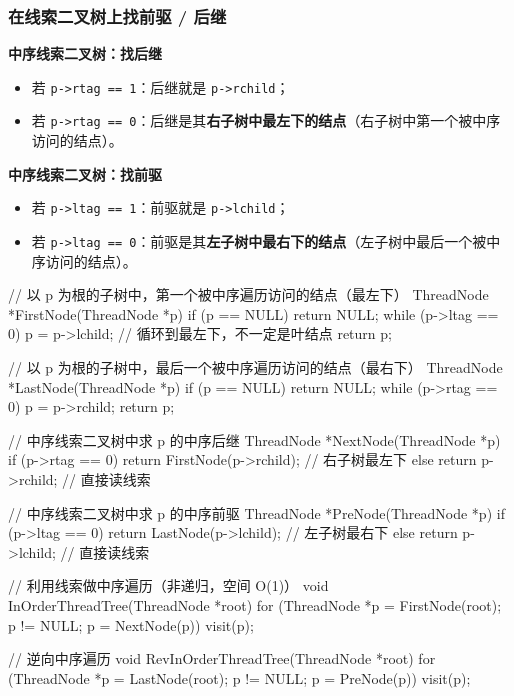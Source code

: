 \documentclass[11pt,openany,UTF8]{ctexbook}
\begin{document}
\subsubsection{在线索二叉树上找前驱 / 后继}

\textbf{中序线索二叉树：找后继}

\begin{itemize}
\item 若 \texttt{p->\allowbreak{}rtag =\allowbreak{}=\allowbreak{} 1}：后继就是 \texttt{p->\allowbreak{}rchild}；
\item 若 \texttt{p->\allowbreak{}rtag =\allowbreak{}=\allowbreak{} 0}：后继是其\textbf{右子树中最左下的结点}（右子树中第一个被中序访问的结点）。
\end{itemize}
\textbf{中序线索二叉树：找前驱}

\begin{itemize}
\item 若 \texttt{p->\allowbreak{}ltag =\allowbreak{}=\allowbreak{} 1}：前驱就是 \texttt{p->\allowbreak{}lchild}；
\item 若 \texttt{p->\allowbreak{}ltag =\allowbreak{}=\allowbreak{} 0}：前驱是其\textbf{左子树中最右下的结点}（左子树中最后一个被中序访问的结点）。
\end{itemize}
\begin{codebox}
// 以 p 为根的子树中，第一个被中序遍历访问的结点（最左下）
ThreadNode *FirstNode(ThreadNode *p) {
    if (p == NULL) return NULL;
    while (p->ltag == 0) p = p->lchild;   // 循环到最左下，不一定是叶结点
    return p;
}

// 以 p 为根的子树中，最后一个被中序遍历访问的结点（最右下）
ThreadNode *LastNode(ThreadNode *p) {
    if (p == NULL) return NULL;
    while (p->rtag == 0) p = p->rchild;
    return p;
}

// 中序线索二叉树中求 p 的中序后继
ThreadNode *NextNode(ThreadNode *p) {
    if (p->rtag == 0) return FirstNode(p->rchild); // 右子树最左下
    else return p->rchild;                          // 直接读线索
}

// 中序线索二叉树中求 p 的中序前驱
ThreadNode *PreNode(ThreadNode *p) {
    if (p->ltag == 0) return LastNode(p->lchild);   // 左子树最右下
    else return p->lchild;                          // 直接读线索
}

// 利用线索做中序遍历（非递归，空间 O(1)）
void InOrderThreadTree(ThreadNode *root) {
    for (ThreadNode *p = FirstNode(root); p != NULL; p = NextNode(p))
        visit(p);
}

// 逆向中序遍历
void RevInOrderThreadTree(ThreadNode *root) {
    for (ThreadNode *p = LastNode(root); p != NULL; p = PreNode(p))
        visit(p);
}
\end{codebox}
\end{document}
